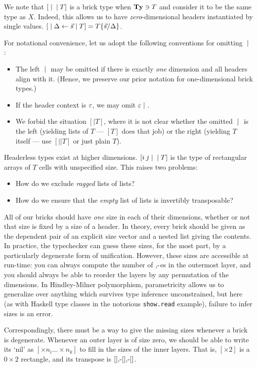 \documentclass{article}
\begin{document}
We note that $[\;|\;\;|\; T]$ is a brick type when $\mathbf{Ty}\ni T$ and consider it to be the same type as $X$. Indeed, this allows us to have \emph{zero}-dimensional headers instantiated by single values. $[\;|\;\Delta\leftarrow\vec s\;|\; T] = T\{\vec s/\Delta\}$.

For notational convenience, let us adopt the following conventions for omitting $\;|\;$:
\begin{itemize}
\item The left $\;|\;$ may be omitted if there is exactly \emph{one} dimension and all headers align with it. (Hence, we preserve our prior notation for one-dimensional brick types.)
\item If the header context is $\varepsilon$, we may omit $\varepsilon\;|\;$.
\item We forbid the situation $[|T]$, where it is not clear whether the omitted $\;|\;$ is the left (yielding lists of $T$ --- $[T]$ does that job) or the right (yielding $T$ itself --- use $[||T]$ or just plain $T$).
\end{itemize}

Headerless types exist at higher dimensions. $[i\: j\;|\; \;|\; T]$ is the type of rectangular arrays of $T$ cells with unspecified size. This raises two problems:
\begin{itemize}
\item How do we exclude \emph{ragged} lists of lists?
\item How do we ensure that the \emph{empty} list of lists is invertibly transposable?
\end{itemize}

All of our bricks should have \emph{one} size in each of their dimensions, whether or not that size is fixed by a size of a header. In theory, every brick should be given as the dependent pair of an explicit size vector and a nested list giving the contents. In practice, the typechecker can guess these sizes, for the most part, by a particularly degenerate form of unification. However, these sizes are accessible at run-time: you can always compute the number of $\mbox{$,\!\textrm{-}$}$es in the outermost layer, and you should always be able to reorder the layers by any permutation of the dimensions. In Hindley-Milner polymorphism, parametricity allows us to generalize over anything which survives type inference unconstrained, but here (as with Haskell type classes in the notorious \texttt{show.read} example), failure to infer sizes is an error.

Correspondingly, there must be a way to give the missing sizes whenever a brick is degenerate. Whenever an outer layer is of size zero, we should be able to write its `nil' as $[\times n_i\ldots\times n_k]$ to fill in the sizes of the inner layers. That is, $[\times 2]$ is a $0\times 2$ rectangle, and its transpose is $[]\mbox{$,\!\textrm{-}$}[]\mbox{$,\!\textrm{-}$}[]$.
\end{document}
